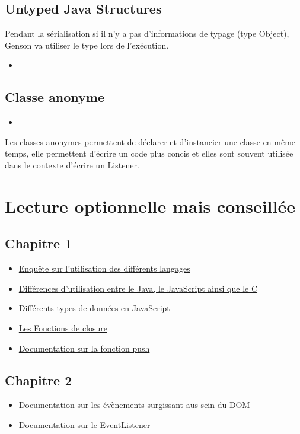 \documentclass{article}[12pt]
\newcommand{\JavaScript}[2]{
	\begin{itemize}
		\item[]
	\end{itemize}
}
\begin{document}
\subsection{Untyped Java Structures}
Pendant la sérialisation si il n'y a pas d'informations de typage (type Object), Genson va utiliser le type lors de l'exécution.
\JavaScript{untyped_java}{Exemple de Structure Java Untyped}
\subsection{Classe anonyme}
\JavaScript{classe_anonyme}{Exemple de classe anonyme}
Les classes anonymes permettent de déclarer et d'instancier une classe en même temps, elle permettent d'écrire un code plus concis et elles sont souvent utilisée dans le contexte d'écrire un Listener.
\section{Lecture optionnelle mais conseillée}
\subsection{Chapitre 1}
\begin{itemize}
	\item \href{http://stackoverflow.com/research/developer-survey-2016}{Enquête sur l'utilisation des différents langages}
    \item \href{http://www.stefankrause.net/wp/?p=144}{Différences d'utilisation entre le Java, le JavaScript ainsi que le C}
    \item \href{http://www.w3schools.com/js/js_datatypes.asp}{Différents types de données en JavaScript}
    \item \href{http://www.w3schools.com/js/js_function_closures.asp}{Les Fonctions de closure}
	\item \href{http://www.w3schools.com/jsref/jsref_push.asp}{Documentation sur la fonction push}
\end{itemize}
\subsection{Chapitre 2}
\begin{itemize}
    \item \href{http://www.w3schools.com/jsref/dom_obj_event.asp}{Documentation sur les évènements surgissant aus sein du DOM}
    \item \href{http://www.w3schools.com/js/js_htmldom_eventlistener.asp}{Documentation sur le EventListener}
\end{itemize}
\end{document}
